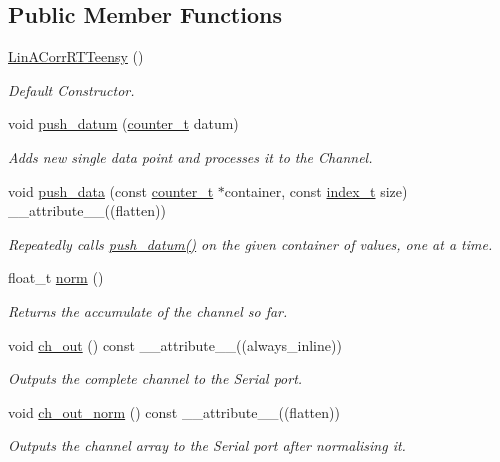 \subsection*{Public Member Functions}
\begin{DoxyCompactItemize}
\item 
\hyperlink{classLinACorrRTTeensy_aebb83829899235fe5177de735a5367da}{Lin\+A\+Corr\+R\+T\+Teensy} ()
\begin{DoxyCompactList}\small\item\em Default Constructor. \end{DoxyCompactList}\item 
void \hyperlink{classLinACorrRTTeensy_aacc634aad2252efbb6ee3a4c2ac422dc}{push\+\_\+datum} (\hyperlink{types_8hpp_a22f279793847eba127de149437848c48}{counter\+\_\+t} datum)
\begin{DoxyCompactList}\small\item\em Adds new {\itshape single} data point and processes it to the {\ttfamily Channel}. \end{DoxyCompactList}\item 
void \hyperlink{classLinACorrRTTeensy_abf6a40dff92088469fbb8ceabf9da799}{push\+\_\+data} (const \hyperlink{types_8hpp_a22f279793847eba127de149437848c48}{counter\+\_\+t} $\ast$container, const \hyperlink{types_8hpp_a7c40bb931c31595ed6308605f4537447}{index\+\_\+t} size) \+\_\+\+\_\+attribute\+\_\+\+\_\+((flatten))
\begin{DoxyCompactList}\small\item\em Repeatedly calls {\ttfamily \hyperlink{classLinACorrRTTeensy_aacc634aad2252efbb6ee3a4c2ac422dc}{push\+\_\+datum()}} on the given container of values, one at a time. \end{DoxyCompactList}\item 
float\+\_\+t \hyperlink{classLinACorrRTTeensy_a98110e3b97a2300b9078a6e57a8234bc}{norm} ()
\begin{DoxyCompactList}\small\item\em Returns the accumulate of the channel so far. \end{DoxyCompactList}\item 
void \hyperlink{classLinACorrRTTeensy_a967f1b3ea7e6ebdae8c9bf7c2c641e49}{ch\+\_\+out} () const \+\_\+\+\_\+attribute\+\_\+\+\_\+((always\+\_\+inline))
\begin{DoxyCompactList}\small\item\em Outputs the complete channel to the Serial port. \end{DoxyCompactList}\item 
void \hyperlink{classLinACorrRTTeensy_a4d1be65472a058b056386286d093b847}{ch\+\_\+out\+\_\+norm} () const \+\_\+\+\_\+attribute\+\_\+\+\_\+((flatten))
\begin{DoxyCompactList}\small\item\em Outputs the channel array to the Serial port after normalising it. \end{DoxyCompactList}\end{DoxyCompactItemize}

